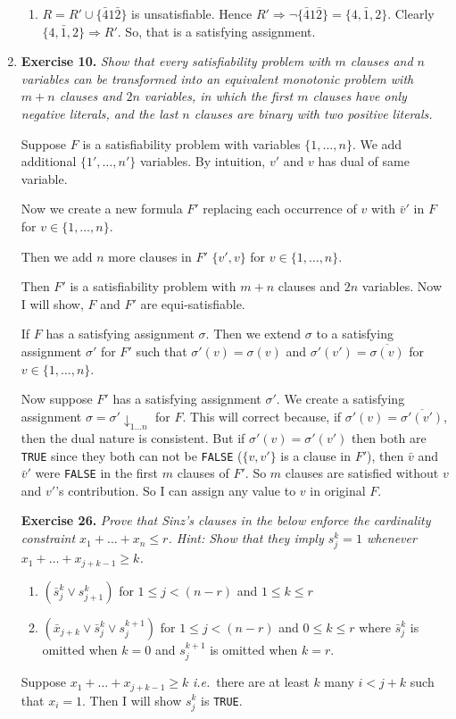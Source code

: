 \documentclass[twoside]{article}
\newcommand{\ie}{\emph{i.e.}\ }
\newcommand{\project}{{\downarrow}}
\begin{document}
\begin{enumerate}
\begin{enumerate}
            \item $R = R' \cup \{\bar41\bar2\}$ is unsatisfiable. Hence $R' \Rightarrow \neg\{\bar41\bar2\} = \{4, \bar1, 2\}$. Clearly $\{4, \bar1, 2\} \Rightarrow R'$. So, that is a satisfying assignment.
          \end{enumerate}

    \item \textbf{Exercise 10.} \textit{Show that every satisfiability problem with $m$ clauses and $n$ variables can be transformed into an equivalent monotonic problem with $m+n$ clauses and $2n$ variables, in which the first $m$ clauses have only negative literals, and the last $n$ clauses are binary with two positive literals.}

          Suppose $F$ is a satisfiability problem with variables $\{1, \ldots, n\}$. We add additional $\{1', \ldots, n'\}$ variables. By intuition, $v'$ and $v$ has dual of same variable.

          Now we create a new formula $F'$ replacing each occurrence of $v$ with $\bar v'$ in $F$ for $v \in \{1, \ldots, n\}$.

          Then we add $n$ more clauses in $F'$ $\{v', v\}$ for $v \in \{1, \ldots, n\}$.

          Then $F'$ is a satisfiability problem with $m+n$ clauses and $2n$ variables. Now I will show, $F$ and $F'$ are equi-satisfiable.

          If $F$ has a satisfying assignment $\sigma$. Then we extend $\sigma$ to a satisfying assignment $\sigma'$ for $F'$ such that $\sigma'(v) = \sigma(v)$ and $\sigma'(v') = \overline{\sigma(v)}$ for $v \in \{1, \ldots, n\}$.

          Now suppose $F'$ has a satisfying assignment $\sigma'$. We create a satisfying assignment $\sigma = \sigma' \project_{1\ldots n}$ for $F$. This will correct because, if $\sigma'(v) = \overline{\sigma'(v')}$, then the dual nature is consistent. But if $\sigma'(v) = \sigma'(v')$ then both are \texttt{TRUE} since they both can not be \texttt{FALSE} ($\{v, v'\}$ is a clause in $F'$), then $\bar v$ and $\bar v'$ were \texttt{FALSE} in the first $m$ clauses of $F'$. So $m$ clauses are satisfied without $v$ and $v'$'s contribution. So I can assign any value to $v$ in original $F$.

          \textbf{Exercise 26.} \textit{Prove that Sinz's clauses in the below enforce the cardinality constraint $x_1 + \ldots + x_n \leq r$. Hint: Show that they imply $s^k_j = 1$ whenever $x_1 + \ldots + x_{j+k-1} \geq k$.}
          \begin{enumerate}
            \item $(\bar s^k_j \vee s^k_{j+1})$ for $1 \leq j < (n-r)$ and $1 \leq k \leq r$
            \item $(\bar x_{j+k} \vee \bar s^k_j \vee s^{k+1}_j)$ for $1 \leq j < (n-r)$ and $0 \leq k \leq r$ where $\bar s^k_j$ is omitted when $k = 0$ and $s^{k+1}_j$ is omitted when $k = r$.
          \end{enumerate}
          Suppose $x_1 + \ldots + x_{j+k-1} \geq k$ \ie there are at least $k$ many $i < j+k$ such that $x_i = 1$. Then I will show $s^k_j$ is \texttt{TRUE}.


\end{enumerate}
\end{document}
